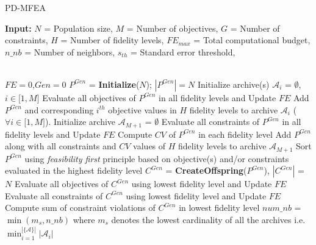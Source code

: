 \begin{minipage}[0.7\textheight]{0.95\columnwidth}
	\begin{spacing}{0.7}
		\begin{algorithm}[H]\footnotesize
			\caption{PD-MFEA}
			\textbf{Input:} $N$\hspace{1mm} = Population size, $M$\hspace{1mm} = Number of objectives, $G$\hspace{1mm} = Number of constraints, $H$\hspace{1mm} = Number of fidelity levels, $FE_{max}$\hspace{1mm} = Total computational budget, $n\_nb$\hspace{1mm} = Number of neighbors, $s_{th}$\hspace{1mm} = Standard error threshold, \\\\
			\begin{algorithmic}[1]
				\STATE $FE=0$,$Gen=0$
				\STATE $P^{Gen}$ = \textbf{Initialize}($N$); $\left|P^{Gen}\right| = N$
				\STATE Initialize archive(s) $\mathcal{A}_i$ = $\emptyset$, $i\in \lbrack 1,M\rbrack$
				\STATE Evaluate all objectives of $P^{Gen}$ in all fidelity levels and Update $FE$
				\STATE Add $P^{Gen}$ and corresponding $i^{th}$ objective values in $H$ fidelity levels to archive $\mathcal{A}_i$ ($\forall i\in \lbrack 1,M\rbrack$).
				\STATE Initialize archive $\mathcal{A}_{M+1}$ = $\emptyset$
				\STATE Evaluate all constraints of $P^{Gen}$ in all fidelity levels and Update $FE$
				\STATE Compute $CV$ of $P^{Gen}$ in each fidelity level
				\STATE Add $P^{Gen}$ along with all constraints and $CV$ values of $H$ fidelity levels to archive $\mathcal{A}_{M+1}$
				\ENDIF
				\STATE Sort $P^{Gen}$ using \textit{feasibility first} principle based on objective(s) and/or constraints evaluated in the highest fidelity level
				\STATE $C^{Gen}$ = \textbf{CreateOffspring}($P^{Gen}$), $\left|C^{Gen}\right|$ = $N$
				\STATE Evaluate all objectives of $C^{Gen}$ using lowest fidelity level and Update $FE$
				\STATE Evaluate all constraints of $C^{Gen}$ using lowest fidelity level and Update $FE$
				\STATE Compute sum of constraint violations of $C^{Gen}$ in lowest fidelity level
				\ENDIF
				\STATE $num\_nb$ = $\min(m_s, n\_nb)$ where $m_s$ denotes the lowest cardinality of all the archives i.e. $\min_{i = 1}^{\left|\mathcal{\{A\}}\right|} \left|\mathcal{A}_i\right|$ \qquad {} \\

\end{algorithmic}
\end{algorithm}
\end{spacing}
\end{minipage}
